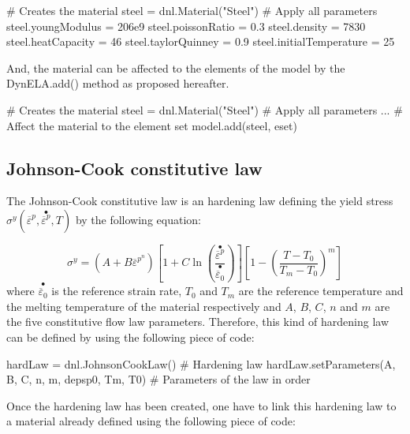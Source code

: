 \begin{PythonListing}
# Creates the material
steel = dnl.Material("Steel")
# Apply all parameters
steel.youngModulus = 206e9
steel.poissonRatio = 0.3
steel.density = 7830
steel.heatCapacity = 46
steel.taylorQuinney = 0.9
steel.initialTemperature = 25
\end{PythonListing}

And, the material can be affected to the elements of the model by
the \textsf{DynELA.add()} method as proposed hereafter.

\begin{PythonListing}
# Creates the material
steel = dnl.Material("Steel")
# Apply all parameters
...
# Affect the material to the element set
model.add(steel, eset)
\end{PythonListing}

\subsection{Johnson-Cook constitutive law}

The Johnson-Cook constitutive law is an hardening law defining the
yield stress $\sigma^{y}(\overline{\varepsilon}^{p},\stackrel{\bullet}{\overline{\varepsilon}^{p}},T)$
by the following equation:

\begin{equation}
\sigma^{y}=\left(A+B\overline{\varepsilon}^{p^{n}}\right)\left[1+C\ln\left(\frac{\stackrel{\bullet}{\overline{\varepsilon}^{p}}}{\stackrel{\bullet}{\overline{\varepsilon}_{0}}}\right)\right]\left[1-\left(\frac{T-T_{0}}{T_{m}-T_{0}}\right)^{m}\right]
\end{equation}
where $\stackrel{\bullet}{\overline{\varepsilon}_{0}}$ is the reference
strain rate, $T_{0}$ and $T_{m}$ are the reference temperature and
the melting temperature of the material respectively and $A$, $B$,
$C$, $n$ and $m$ are the five constitutive flow law parameters.
Therefore, this kind of hardening law can be defined by using the
following piece of code:

\begin{PythonListing}
hardLaw = dnl.JohnsonCookLaw()                       # Hardening law
hardLaw.setParameters(A, B, C, n, m, depsp0, Tm, T0) # Parameters of the law in order
\end{PythonListing}

Once the hardening law has been created, one have to link this hardening
law to a material already defined using the following piece of code:

